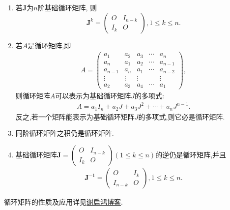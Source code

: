 \documentclass[../../main.tex]{subfiles}
\begin{document}
\begin{proposition}[循环矩阵的性质]\label{proposition:循环矩阵的性质}
\begin{enumerate}
\item 若$\boldsymbol{J}$为$n$阶基础循环矩阵,
则
\[
\boldsymbol{J}^{k} = 
\begin{pmatrix}
O & I_{n - k} \\
I_{k} & O
\end{pmatrix},  1 \leq k \leq n.
\]
\item 若$A$是循环矩阵,即\begin{align*}
A=\begin{pmatrix}
a_1 & a_2 & a_3 & \cdots & a_n \\
a_n & a_1 & a_2 & \cdots & a_{n - 1} \\
a_{n - 1} & a_n & a_1 & \cdots & a_{n - 2} \\
\vdots & \vdots & \vdots & & \vdots \\
a_2 & a_3 & a_4 & \cdots & a_1
\end{pmatrix},
\end{align*}
则循环矩阵$A$可以表示为基础循环矩阵$J$的多项式:
\begin{align*}
A=a_1I_n+a_2J+a_3J^2+\cdots+a_nJ^{n-1}.
\end{align*}
反之,若一个矩阵能表示为基础循环矩阵$J$的多项式,则它必是循环矩阵.
\item \label{example:iten546641856}同阶循环矩阵之积仍是循环矩阵.
\item 基础循环矩阵$\boldsymbol{J}=
\begin{pmatrix}
O & I_{n - k} \\
I_{k} & O
\end{pmatrix} (1 \leq k \leq n)$的逆仍是循环矩阵,并且
\begin{align*}
\boldsymbol{J}^{-1} =\begin{pmatrix}
O & I_{k} \\
I_{n-k} & O
\end{pmatrix},1 \leq k \leq n.
\end{align*}
\end{enumerate}
\end{proposition}
\begin{note}
循环矩阵的性质及应用详见\href{https://www.cnblogs.com/torsor/p/8848641.html}{谢启鸿博客}.
\end{note}
\end{document}
